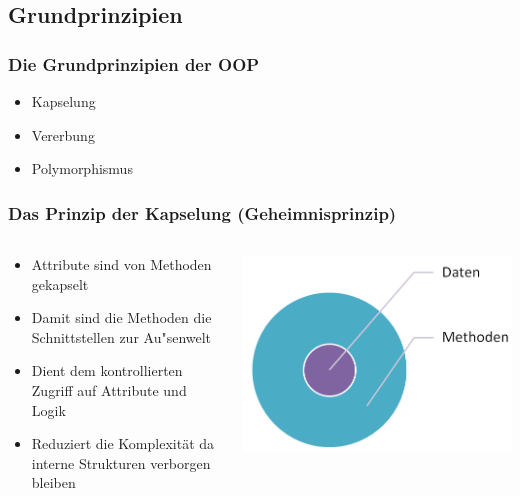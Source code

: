 \subsection{Grundprinzipien}
\begin{frame}
\frametitle{Die Grundprinzipien der OOP}
\begin{itemize} 
  \item Kapselung\linebreak
  \item Vererbung\linebreak
  \item Polymorphismus\linebreak
\end{itemize}
\end{frame} 

\begin{frame}
\frametitle{Das Prinzip der Kapselung (Geheimnisprinzip)}
\begin{columns}
    \begin{column}{.5\textwidth}
		\small
		\begin{itemize}
		  \item Attribute sind von Methoden gekapselt
		  \item Damit sind die Methoden die Schnittstellen zur
		  		Au"senwelt
		  \item Dient dem kontrollierten Zugriff auf Attribute und Logik
		  \item Reduziert die Komplexit\"at da interne Strukturen verborgen bleiben
		\end{itemize}
	\end{column}
	\begin{column}{.5\textwidth} 
		\center
		\includegraphics[width=1\textwidth,
		keepaspectratio=true]{bilder/kapselung.png}
	\end{column}
\end{columns}
\end{frame}

